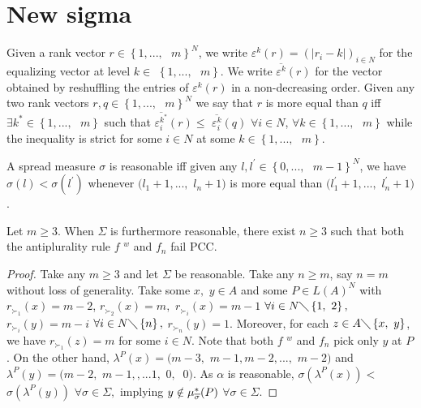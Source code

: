 \documentclass[version=3.21, pagesize, twoside=off, bibliography=totoc, DIV=calc, fontsize=12pt, a4paper]{scrartcl}
\begin{document}
\section{New sigma}
Given a rank vector $r\in \left\{ 1,...,\text{ }m\right\} ^{N}$, we write $%
\varepsilon ^{k}(r)=(\left\vert r_{i}-k\right\vert )_{i\in N}$ for the
equalizing vector at level $k\in $ $\left\{ 1,...,\text{ }m\right\} $. We
write $\overline{\varepsilon ^{k}}(r)$ for the vector obtained by
reshuffling the entries of $\varepsilon ^{k}(r)$ in a non-decreasing order.
Given any two rank vectors $r,q\in \left\{ 1,...,\text{ }m\right\} ^{N}$ we
say that $r$ is more equal than $q$ iff $\exists k^{\ast }\in \left\{ 1,...,%
\text{ }m\right\} $ such that $\overline{\varepsilon _{i}^{k^{\ast }}}%
(r)\leq $ $\overline{\varepsilon _{i}^{k}}(q)$ $\forall i\in N$, $\forall
k\in \left\{ 1,...,\text{ }m\right\} $ while the inequality is strict for
some $i\in N$ at some $k\in \left\{ 1,...,\text{ }m\right\} $.

A spread measure $\sigma $ is reasonable iff given any $l,l^{\prime }\in
\left\{ 0,...,\text{ }m-1\right\} ^{N}$, we have $\sigma (l)<\sigma
(l^{\prime })$ whenever $(l_{1}+1,...,$ $l_{n}+1)$ is more equal than $%
(l_{1}^{\prime }+1,...,$ $l_{n}^{\prime }+1)$.

\begin{theorem}
	Let $m\geq 3.$ When $\Sigma $ is furthermore reasonable, there exist $n\geq
	3 $ such that both the antiplurality rule $f$ $^{w}$ and $f_{n}$ fail PCC.
	\end{theorem}
	
	\begin{proof}
		Take any $m\geq 3$ and let $\Sigma $ be reasonable. Take any $n\geq m$, say $%
		n=m$ without loss of generality. Take some $x,$ $y\in A$ and some $P\in
		L(A)^{N}$ with $r_{\succ _{1}}(x)=m-2$, $r_{\succ _{2}}(x)=m,$ $r_{\succ
			_{i}}(x)=m-1$ $\forall i\in N\diagdown \left\{ 1,\text{ }2\right\} ,$ $%
			r_{\succ _{i}}(y)=m-i$ $\forall i\in N\diagdown \left\{ n\right\} ,$ $%
			r_{\succ _{n}}(y)=1$. Moreover, for each $z\in A\diagdown \left\{ x,\text{ }%
			y\right\} $, we have $r_{\succ _{1}}(z)=m$ for some $i\in N$. Note that both 
			$f$ $^{w}$ and $f_{n}$ pick only $y$ at $P$. On the other hand, $\lambda
			^{P}(x)=(m-3,$ $m-1,m-2,...,$ $m-2)$ and $\lambda ^{P}(y)=(m-2,$ $m-1,,...1,$
			$0,$ $\ 0)$. As $\alpha $ is reasonable, $\sigma (\lambda ^{P}(x))<$ $\sigma
			(\lambda ^{P}(y))$ $\forall \sigma \in \Sigma ,$ implying $y\notin \mu _{%
				\overline{\sigma }}^{\ast }(P)$ $\forall \sigma \in \Sigma .$
	\end{proof}
\end{document}
